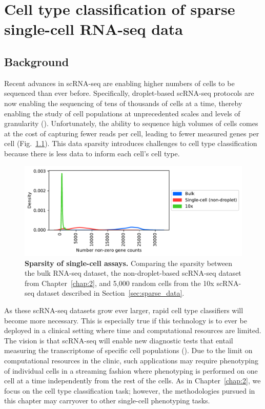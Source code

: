 \chapter{Cell type classification of sparse single-cell RNA-seq data} \label{chap:3}

\section{Background}

Recent advances in scRNA-seq are enabling higher numbers of cells to be sequenced than ever before. Specifically, droplet-based scRNA-seq protocols are now enabling the sequencing of tens of thousands of cells at a time, thereby enabling the study of cell populations at unprecedented scales and levels of granularity (\citealp{TabulaMuris2018, Zheng2017, Macosko2015}).  Unfortunately, the ability to sequence high volumes of cells comes at the cost of capturing fewer reads per cell, leading to fewer measured genes per cell (Fig.~\ref{fig:sparsity}).  This data sparsity introduces challenges to cell type classification because there is less data to inform each cell's cell type.  

 \begin{figure}[h!]
      \centerline{\includegraphics[width=13cm]{figures/num_genes_expressed_distribution.pdf}}
      \caption{\textbf{Sparsity of single-cell assays.} Comparing the sparsity between the bulk RNA-seq dataset, the non-droplet-based scRNA-seq dataset from Chapter~\ref{chap:2}, and 5,000 random cells from the \cite{Zhang2018} 10x scRNA-seq dataset described in Section~\ref{sec:sparse_data}.}
      \label{fig:sparsity}
      \end{figure} 

As these scRNA-seq datasets grow ever larger, rapid cell type classifiers will become more necessary.  This is especially true if this technology is to ever be deployed in a clinical setting where time and computational resources are limited.  The vision is that scRNA-seq will enable new diagnostic tests that entail measuring the transcriptome of specific cell populations (\citealp{Haque2017}).  Due to the limit on computational resources in the clinic, such applications may require phenotyping of individual cells in a streaming fashion where phenotyping is performed on one cell at a time independently from the rest of the cells.  As in Chapter~\ref{chap:2}, we focus on the cell type classification task; however, the methodologies pursued in this chapter may carryover to other single-cell phenotyping tasks. 

